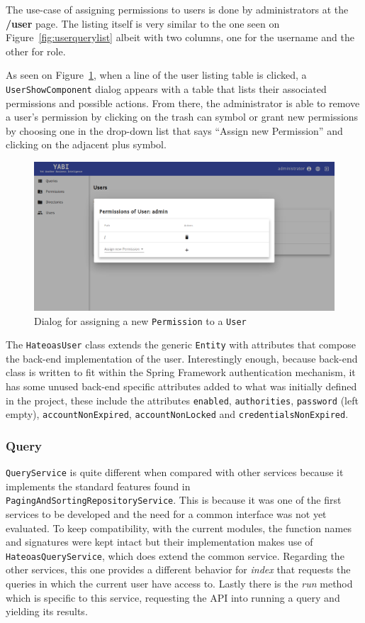 The use-case of assigning permissions to users is done by administrators at the \textbf{/user} page. The listing itself is very similar to the one seen on Figure~\ref{fig:userquerylist} albeit with two columns, one for the username and the other for role.

As seen on Figure~\ref{fig:adminpermisisonnew}, when a line of the user listing table is clicked, a \texttt{UserShowComponent} dialog appears with a table that lists their associated permissions and possible actions. From there, the administrator is able to remove a user's permission by clicking on the trash can symbol or grant new permissions by choosing one in the drop-down list that says ``Assign new Permission'' and clicking on the adjacent plus symbol.

\begin{figure}
  \centering
  \includegraphics[width=.8\textwidth]{images/screenshots/user/admin-permission-new}
  \caption{Dialog for assigning a new \texttt{Permission} to a \texttt{User}}\label{fig:adminpermisisonnew}
\end{figure}

The \texttt{HateoasUser} class extends the generic \texttt{Entity} with attributes that compose the back-end implementation of the user. Interestingly enough, because back-end class is written to fit within the Spring Framework authentication mechanism, it has some unused back-end specific attributes added to what was initially defined in the project, these include the attributes \texttt{enabled}, \texttt{authorities}, \texttt{password} (left empty), \texttt{accountNonExpired}, \texttt{accountNonLocked} and \texttt{credentialsNonExpired}.

\subsubsection{Query}
\texttt{QueryService} is quite different when compared with other services because it implements the standard features found in \texttt{PagingAndSortingRepositoryService}. This is because it was one of the first services to be developed and the need for a common interface was not yet evaluated. To keep compatibility, with the current modules, the function names and signatures were kept intact but their implementation makes use of \texttt{HateoasQueryService}, which does extend the common service. Regarding the other services, this one provides a different behavior for \textit{index} that requests the queries in which the current user have access to. Lastly there is the \textit{run} method which is specific to this service, requesting the \gls{API} into running a query and yielding its results.

